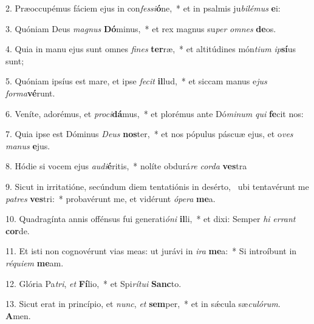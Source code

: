 2. Præoccupémus fáciem ejus in con\textit{fes}\textit{si}\textbf{ó}ne,~*  et in psalmis ju\textit{bi}\textit{lé}\textit{mus} \textbf{e}i:\

3. Quóniam Deus \textit{ma}\textit{gnus} \textbf{Dó}minus,~*  et rex magnus su\textit{per} \textit{om}\textit{nes} \textbf{de}os.\

4. Quia in manu ejus sunt omnes \textit{fi}\textit{nes} \textbf{ter}ræ,~*  et altitúdines món\textit{ti}\textit{um} \textit{ip}\textbf{sí}us sunt;\

5. Quóniam ipsíus est mare, et ipse \textit{fe}\textit{cit} \textbf{il}lud,~*  et siccam manus e\textit{jus} \textit{for}\textit{ma}\textbf{vé}runt.\

6. Veníte, adorémus, et \textit{pro}\textit{ci}\textbf{dá}mus,~*  et plorémus ante Dó\textit{mi}\textit{num} \textit{qui} \textbf{fe}cit nos:\

7. Quia ipse est Dóminus \textit{De}\textit{us} \textbf{nos}ter,~*  et nos pópulus páscuæ ejus, et o\textit{ves} \textit{ma}\textit{nus} \textbf{e}jus.\

8. Hódie si vocem ejus \textit{au}\textit{di}\textbf{é}ritis,~*  nolíte obdurá\textit{re} \textit{cor}\textit{da} \textbf{ves}tra\

9. Sicut in irritatióne, secúndum diem tentatiónis in desérto, \dag\  ubi tentavérunt me \textit{pa}\textit{tres} \textbf{ves}tri:~*  probavérunt me, et vidérunt \textit{ó}\textit{pe}\textit{ra} \textbf{me}a.\

10. Quadragínta annis offénsus fui generati\textit{ó}\textit{ni} \textbf{il}li,~*  et dixi: Semper \textit{hi} \textit{er}\textit{rant} \textbf{cor}de.\

11. Et isti non cognovérunt vias meas: ut jurávi in \textit{i}\textit{ra} \textbf{me}a:~*  Si introíbunt in \textit{ré}\textit{qui}\textit{em} \textbf{me}am.\

12. Glória Pa\textit{tri}, \textit{et} \textbf{Fí}lio,~*  et Spi\textit{rí}\textit{tu}\textit{i} \textbf{Sanc}to.\

13. Sicut erat in princípio, et \textit{nunc}, \textit{et} \textbf{sem}per,~*  et in sǽcula sæ\textit{cu}\textit{ló}\textit{rum}. \textbf{A}men.\

